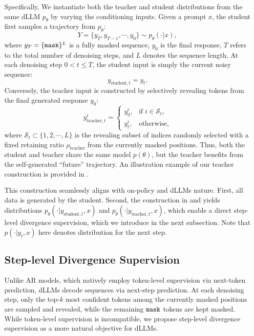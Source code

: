 \documentclass{article}
\begin{document}
Specifically, We instantiate both the teacher and student distributions from the same dLLM $p_\theta$ by varying the conditioning inputs. Given a prompt $x$, the student first samples a trajectory from $p_\theta$:
\begin{equation}
    Y = \{ y_T, y_{T-1}, \cdots, y_0 \} \sim p_\theta (\cdot | x),
\label{eq7}
\end{equation}
where $y_T = \{ {\texttt{mask}} \}^L$ is a fully masked sequence, $y_0$ is the final response, $T$ refers to the total number of denoising steps, and $L$ denotes the sequence length. At each denoising step $0<t \leq T$, the student input is simply the current noisy sequence:
\begin{equation}
    y_{\text{student},t} = y_t.
\label{eq8}
\end{equation}
Conversely, the teacher input is constructed by selectively revealing tokens from the final generated response $y_0$:
\begin{equation}
y_{\text{teacher},t}^i =
\begin{cases}
y_0^i, & \text{if } i \in \mathcal{S}_t,\\[4pt]
y_t^i, & \text{otherwise},
\end{cases}
\label{eq9}
\end{equation}
where $\mathcal{S}_t \subset \{ 1, 2, \cdots, L \}$ is the revealing subset of indices randomly selected with a fixed retaining ratio $\rho_\text{teacher}$ from the currently masked positions. Thus, both the student and teacher share the same model $p(\theta)$, but the teacher benefits from the self-generated ``future'' trajectory. An illustration example of our teacher construction is provided in . 

This construction seamlessly aligns with on-policy and dLLMs nature. First, all data is generated by the student. Second, the construction in  and  yields distributions $p_\theta(\cdot | y_{\text{student}, t}, x)$ and $p_\theta(\cdot | y_{\text{teacher}, t}, x)$, which enable a direct step-level divergence supervision, which we introduce in the next subsection. Note that $p(\cdot | y_{t}, x)$ here denotes distribution for the next step.


\subsection{Step-level Divergence Supervision} \label{sec3.2}


Unlike AR models, which natively employ token-level supervision via next-token prediction, dLLMs decode sequences via next-step prediction. At each denoising step, only the top-$k$ most confident tokens among the currently masked positions are sampled and revealed, while the remaining ${\texttt{mask}}$ tokens are kept masked. While token-level supervision is incompatible, we propose step-level divergence supervision as a more natural objective for dLLMs.
\end{document}
